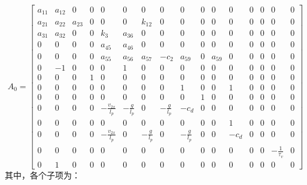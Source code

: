         \begin{equation}
        A_0 = \begin{bmatrix}
        a_{11} & a_{12} & 0 & 0 & 0 & 0 & 0 & 0 & 0 & 0 & 0 & 0 & 0 & 0 & 0 & 0 \\
        a_{21} & a_{22} & a_{23} & 0 & 0 & 0 & k_{12} & 0 & 0 & 0 & 0 & 0 & 0 & 0 & 0 & 0 \\
        a_{31} & a_{32} & 0 & 0 & k_3 & a_{36} & 0 & 0 & 0 & 0 & 0 & 0 & 0 & 0 & 0 & 0 \\
        0 & 0 & 0 & 0 & a_{45} & a_{46} & 0 & 0 & 0 & 0 & 0 & 0 & 0 & 0 & 0 & 0 \\
        0 & 0 & 0 & 0 & a_{55} & a_{56} & a_{57} & -c_2 & a_{59} & 0 & a_{59} & 0 & 0 & 0 & 0 & 0 \\
        0 & -1 & 0 & 0 & 0 & 1 & 0 & 0 & 0 & 0 & 0 & 0 & 0 & 0 & 0 & 0 \\
        0 & 0 & 0 & 1 & 0 & 0 & 0 & 0 & 0 & 0 & 0 & 0 & 0 & 0 & 0 & 0 \\
        0 & 0 & 0 & 0 & 0 & 0 & 0 & 0 & 1 & 0 & 0 & 1 & 0 & 0 & 0 & 0 \\
        0 & 0 & 0 & 0 & 0 & 0 & 0 & 0 & 0 & 1 & 0 & 0 & 0 & 0 & 0 & 0 \\
        0 & 0 & 0 & 0 & -\frac{v_{2x}}{l_p} & -\frac{g}{l_p} & 0 & -\frac{g}{l_p} & -c_d & 0 & 0 & 0 & 0 & 0 & 0 & 0 \\
        0 & 0 & 0 & 0 & 0 & 0 & 0 & 0 & 0 & 0 & 0 & 1 & 0 & 0 & 0 & 0 \\
        0 & 0 & 0 & 0 & -\frac{v_{2x}}{l_p} & 0 & -\frac{g}{l_p} & 0 & -\frac{g}{l_p} & 0 & 0 & -c_d & 0 & 0 & 0 & 0 \\
        0 & 0 & 0 & 0 & 0 & 0 & 0 & 0 & 0 & 0 & 0 & 0 & 0 & 0 & -\frac{1}{\tau_v} & 0 \\
        0 & 1 & 0 & 0 & 0 & 0 & 0 & 0 & 0 & 0 & 0 & 0 & 0 & 0 & 0 & 0
        \end{bmatrix}
        \label{eq:A_0}
        \end{equation}
        \noindent 其中，各个子项为：
